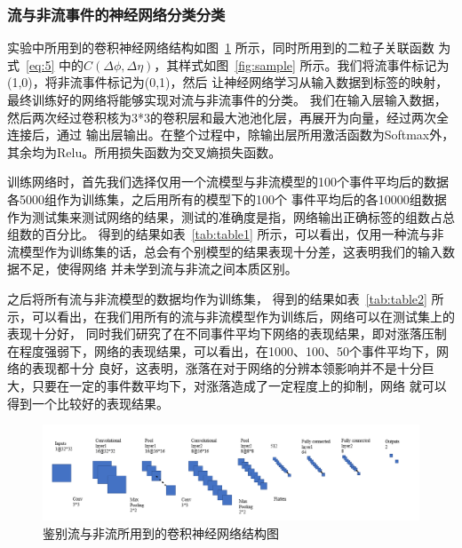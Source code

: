 \documentclass[aps,pre,12pt,preprint,onecolumn,showpacs,showkeys]{revtex4-1}
\begin{document}
\subsubsection{流与非流事件的神经网络分类分类}
实验中所用到的卷积神经网络结构如图~\ref{fig:sjwl} 所示，同时所用到的二粒子关联函数
为式~\ref{eq:5} 中的$C(\Delta\phi,\Delta\eta)$，其样式如图~\ref{fig:sample} 所示。我们将流事件标记为(1,0)，将非流事件标记为(0,1)，然后
让神经网络学习从输入数据到标签的映射，最终训练好的网络将能够实现对流与非流事件的分类。
我们在输入层输入数据，然后两次经过卷积核为3*3的卷积层和最大池池化层，再展开为向量，经过两次全连接后，通过
输出层输出。在整个过程中，除输出层所用激活函数为Softmax外，其余均为Relu。所用损失函数为交叉熵损失函数。\par
训练网络时，首先我们选择仅用一个流模型与非流模型的100个事件平均后的数据各5000组作为训练集，之后用所有的模型下的100个
事件平均后的各10000组数据作为测试集来测试网络的结果，测试的准确度是指，网络输出正确标签的组数占总组数的百分比。
得到的结果如表~\ref{tab:table1} 所示，可以看出，仅用一种流与非流模型作为训练集的话，总会有个别模型的结果表现十分差，这表明我们的输入数据不足，使得网络
并未学到流与非流之间本质区别。\par
之后将所有流与非流模型的数据均作为训练集，
得到的结果如表~\ref{tab:table2} 所示，可以看出，在我们用所有的流与非流模型作为训练后，网络可以在测试集上的表现十分好，
同时我们研究了在不同事件平均下网络的表现结果，即对涨落压制在程度强弱下，网络的表现结果，可以看出，在1000、100、50个事件平均下，网络的表现都十分
良好，这表明，涨落在对于网络的分辨本领影响并不是十分巨大，只要在一定的事件数平均下，对涨落造成了一定程度上的抑制，网络
就可以得到一个比较好的表现结果。
\begin{figure}[htbp]
\centering
\includegraphics[width=140mm]{sjwl}
\caption{\label{fig:sjwl}%
鉴别流与非流所用到的卷积神经网络结构图}
\end{figure}
\end{document}
